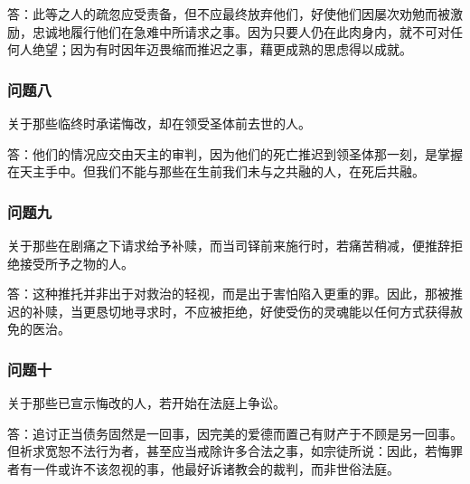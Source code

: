 答：此等之人的疏忽应受责备，但不应最终放弃他们，好使他们因屡次劝勉而被激励，忠诚地履行他们在急难中所请求之事。因为只要人仍在此肉身内，就不可对任何人绝望；因为有时因年迈畏缩而推迟之事，藉更成熟的思虑得以成就。\par


\subsubsection{问题八}

关于那些临终时承诺悔改，却在领受圣体前去世的人。\par

答：他们的情况应交由天主的审判，因为他们的死亡推迟到领圣体那一刻，是掌握在天主手中。但我们不能与那些在生前我们未与之共融的人，在死后共融。\par


\subsubsection{问题九}

关于那些在剧痛之下请求给予补赎，而当司铎前来施行时，若痛苦稍减，便推辞拒绝接受所予之物的人。\par

答：这种推托并非出于对救治的轻视，而是出于害怕陷入更重的罪。因此，那被推迟的补赎，当更恳切地寻求时，不应被拒绝，好使受伤的灵魂能以任何方式获得赦免的医治。\par


\subsubsection{问题十}

关于那些已宣示悔改的人，若开始在法庭上争讼。\par

答：追讨正当债务固然是一回事，因完美的爱德而置己有财产于不顾是另一回事。但祈求宽恕不法行为者，甚至应当戒除许多合法之事，如宗徒所说：因此，若悔罪者有一件或许不该忽视的事，他最好诉诸教会的裁判，而非世俗法庭。\par

